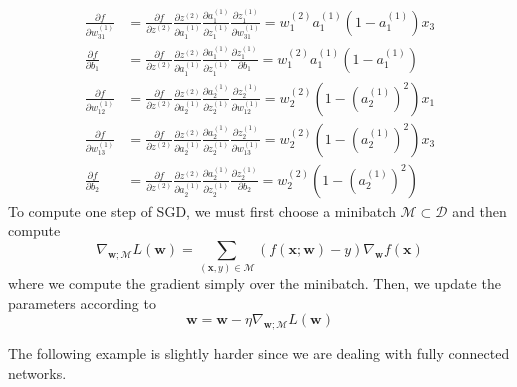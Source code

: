 \documentclass{article}
\begin{document}
\begin{solution}
\begin{align*}
          \frac{\partial f}{\partial w_{31}^{(1)}} & = \frac{\partial f}{\partial z^{(2)}} \frac{\partial z^{(2)}}{\partial a^{(1)}_1} \frac{\partial a^{(1)}_1}{\partial z_1^{(1)}} \frac{\partial z_1^{(1)}}{\partial w_{31}^{(1)}} = w_1^{(2)} a_1^{(1)} (1 - a_1^{(1)}) x_3\\
          \frac{\partial f}{\partial b_{1}} & = \frac{\partial f}{\partial z^{(2)}} \frac{\partial z^{(2)}}{\partial a^{(1)}_1} \frac{\partial a^{(1)}_1}{\partial z_1^{(1)}} \frac{\partial z_1^{(1)}}{\partial b_{1}}  = w_1^{(2)} a_1^{(1)} (1 - a_1^{(1)}) \\
          \frac{\partial f}{\partial w_{12}^{(1)}} & = \frac{\partial f}{\partial z^{(2)}} \frac{\partial z^{(2)}}{\partial a^{(1)}_2} \frac{\partial a^{(1)}_2}{\partial z_2^{(1)}} \frac{\partial z_2^{(1)}}{\partial w_{12}^{(1)}} = w_2^{(2)} (1 - (a_2^{(1)})^2 ) x_1\\
          \frac{\partial f}{\partial w_{13}^{(1)}} & = \frac{\partial f}{\partial z^{(2)}} \frac{\partial z^{(2)}}{\partial a^{(1)}_2} \frac{\partial a^{(1)}_2}{\partial z_2^{(1)}} \frac{\partial z_2^{(1)}}{\partial w_{13}^{(1)}} = w_2^{(2)} (1 - (a_2^{(1)})^2 ) x_3 \\
          \frac{\partial f}{\partial b_{2}} & = \frac{\partial f}{\partial z^{(2)}} \frac{\partial z^{(2)}}{\partial a^{(1)}_2} \frac{\partial a^{(1)}_2}{\partial z_2^{(1)}} \frac{\partial z_2^{(1)}}{\partial b_{2}} = w_2^{(2)} (1 - (a_2^{(1)})^2 )
      \end{align*}
      To compute one step of SGD, we must first choose a minibatch $\mathcal{M} \subset \mathcal{D}$ and then compute 
      \[\nabla_{\mathbf{w}; \mathcal{M}} L(\mathbf{w}) = \sum_{(\mathbf{x}, y) \in \mathcal{M}} (f(\mathbf{x}; \mathbf{w}) - y) \nabla_{\mathbf{w}} f(\mathbf{x})\] 
      where we compute the gradient simply over the minibatch. Then, we update the parameters according to 
      \[\mathbf{w} = \mathbf{w} - \eta \nabla_{\mathbf{w}; \mathcal{M}} L(\mathbf{w}) \]
    \end{solution}

    The following example is slightly harder since we are dealing with fully connected networks. 
\end{document}
